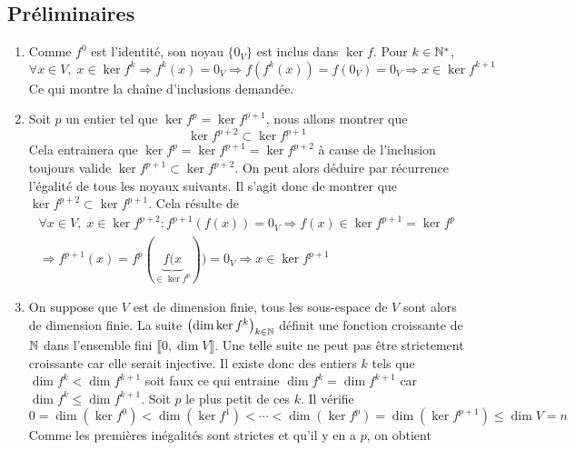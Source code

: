 \subsection*{Pr{\'e}liminaires}
\begin{enumerate}
 \item Comme $f^0$ est l'identité, son noyau $\{0_V\}$ est inclus dans $\ker f$. Pour $k\in \mathbb{N}^*$,
\begin{displaymath}
 \forall x\in V, \; x\in\ker f^k
\Rightarrow f^k(x)=0_V \Rightarrow f\left( f^k(x)\right) = f(0_V)=0_V
\Rightarrow x\in\ker f^{k+1}
\end{displaymath}
Ce qui montre la chaîne d'inclusions demandée.
\item Soit $p$ un entier tel que $\ker f^p = \ker f^{p+1}$, nous allons montrer que 
\begin{displaymath}
 \ker f^{p+2} \subset \ker f^{p+1}
\end{displaymath}
Cela entrainera que $\ker f^p = \ker f^{p+1} = \ker f^{p+2}$ à cause de l'inclusion  toujours valide $\ker f^{p+1} \subset \ker f^{p+2}$. On peut alors déduire par récurrence l'égalité de tous les noyaux suivants.\newline
Il s'agit donc de montrer que $\ker f^{p+2} \subset \ker f^{p+1}$.
Cela résulte de 
\begin{multline*}
 \forall x\in V, \; x\in \ker f^{p+2} : f^{p+1}(f(x))=0_V\Rightarrow f(x)\in \ker f^{p+1}=\ker f^{p} \\
\Rightarrow f^{p+1}(x)=f^p(\underset{\in \ker f^p}{\underbrace{f(x}}))=0_V 
\Rightarrow x\in \ker f^{p+1}
\end{multline*}
\item On suppose que $V$ est de dimension finie, tous les sous-espace de $V$ sont alors de dimension finie. La suite $\left( \dim \ker f^k \right) _{k\in \mathbb{N}}$ définit une fonction croissante de $\mathbb{N}$ dans l'ensemble fini $\llbracket 0, \dim V\rrbracket$. Une telle suite ne peut pas être strictement croissante car elle serait injective. Il existe donc des entiers $k$ tels que $\dim f^k < \dim f^{k+1}$ soit faux ce qui entraine $\dim f^k = \dim f^{k+1}$ car $\dim f^k \leq \dim f^{k+1}$. Soit $p$ le plus petit de ces $k$. Il vérifie
\begin{displaymath}
 0=\dim (\ker f^0) < \dim (\ker f^1)< \cdots<\dim (\ker f^p) = \dim (\ker f^{p+1}) \leq \dim V=n
\end{displaymath}
Comme les premières inégalités sont strictes et qu'il y en a $p$, on obtient
\begin{displaymath}

\end{displaymath}
\end{enumerate}
